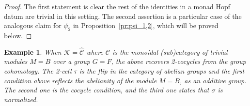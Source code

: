 \documentclass[a4paper, 12pt]{article}
\renewcommand{\_}[1]{\mbox{$_{\left( #1 \right)}$}}
\theoremstyle{plain}
\newtheorem{ex}[thm]{Example}
\newcommand{\qed}{\hfill\quad\fbox{\rule[0mm]{0,0cm}{0,0mm}}  \par\bigskip}
\newcommand{\C}{{\mathcal C}}
\def\K{{\mathcal K}}  %
\newcommand{\exlabel}[1]{\label{ex:#1}}
\newcommand{\prref}[1]{Proposition~\ref{pr:#1}}
\begin{document}
\begin{proof}
The first statement is clear the rest of the identities in a monad Hopf datum are trivial in this setting. The second assertion is a particular case of the 
analogous claim for $\psi_2$ in \prref{psi_1,2}, which will be proved below. 
\qed\end{proof}



\begin{ex} \exlabel{group coh}
When $\K=\hat\C$ where $\C$ is the monoidal (sub)category of trivial modules $M=B$ over a group $G=F$, the above recovers 2-cocycles from the group cohomology. The 2-cell $\tau$ is the flip 
in the category of abelian groups and the first condition above reflects the abelianity of the module $M=B$, as an additive group. The second one is the cocycle condition, and the 
third one states that $\sigma$ is normalized.  
\end{ex}
\end{document}
